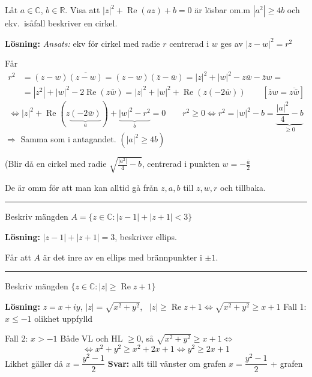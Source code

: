 \quad Låt $a \in \mathbb{C}$, $b \in \mathbb{R}$. Visa att $|z|^2 + \operatorname{Re}(az) + b = 0$ är lösbar om.m $|a^2| \ge 4b$ och ekv.\ isåfall beskriver en cirkel.

\textbf{Lösning:} \emph{Ansats:} ekv för cirkel med radie $r$ centrerad i $w$ ges av $|z - w|^2 = r^2$

Får
\begin{align*}
  r^2 &= (z - w)\overline{(z - w)} = (z - w)(\bar{z} - \bar{w}) = |z|^2 + |w|^2 - z\bar{w} - \bar{z}w = \\
  &= |z^2| + |w|^2 - 2\operatorname{Re}(z\bar{w}) = |z|^2 + |w|^2 + \operatorname{Re}(z(-2\bar{w})) \qquad [\bar{z}w = \overline{z\bar{w}}]
\end{align*}
\[ \Leftrightarrow |z|^2 + \operatorname{Re}(z\underbrace{(-2\bar{w})}_{a}) + \underbrace{|w|^2 - r^2}_{b} = 0 \qquad r^2 \ge 0 \Leftrightarrow r^2 = |w|^2 - b = \underbrace{\frac{|a|^2}{4} - b}_{\ge 0} \]
\textcolor{blue!60!black}{$\Rightarrow$ Samma som i antagandet. $(|a|^2 \ge 4b)$}

\textcolor{blue!60!black}{(Blir då en cirkel med radie $\sqrt{\frac{|a^2|}{4} - b}$, centrerad i punkten $w = -\frac{\bar{a}}{2}$}

\textcolor{blue!60!black}{De är omm för att man kan alltid gå från $z, a, b$ till $z, w, r$ och tillbaka.}

\noindent\rule{\linewidth}{0.4pt}

 \quad Beskriv mängden $A = \{z \in \mathbb{C} : |z - 1| + |z + 1| < 3\}$

\textbf{Lösning:}
$|z - 1| + |z + 1| = 3$, beskriver ellips.

Får att $A$ är det inre av en ellips med brännpunkter i $\pm 1$.

\noindent\rule{\linewidth}{0.4pt}

 \quad Beskriv mängden $\{z \in \mathbb{C} : |z| \ge \operatorname{Re} z + 1\}$

\textbf{Lösning:} $z = x + iy$, $|z| = \sqrt{x^2 + y^2}$, \ $|z| \ge \operatorname{Re} z + 1 \Leftrightarrow \sqrt{x^2 + y^2} \ge x + 1$
Fall 1: $x \le -1$ \quad olikhet uppfylld

Fall 2: $x > -1$ \quad Både VL och HL $\ge 0$, så $\sqrt{x^2 + y^2} \ge x + 1 \Leftrightarrow$
\[ \Leftrightarrow x^2 + y^2 \ge x^2 + 2x + 1 \Leftrightarrow y^2 \ge 2x + 1 \]
\textcolor{blue!60!black}{Likhet gäller då $x = \dfrac{y^2 - 1}{2}$} \qquad \textcolor{blue!60!black}{\textbf{Svar:} allt till vänster om grafen $x = \dfrac{y^2 - 1}{2}$ + grafen}
